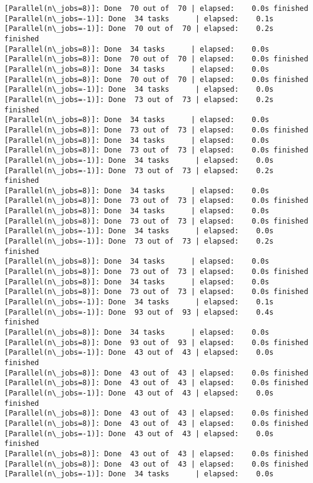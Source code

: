 \documentclass[11pt]{article}
\begin{document}
\begin{Verbatim}[commandchars=\\\{\}]
[Parallel(n\_jobs=8)]: Done  70 out of  70 | elapsed:    0.0s finished
[Parallel(n\_jobs=-1)]: Done  34 tasks      | elapsed:    0.1s
[Parallel(n\_jobs=-1)]: Done  70 out of  70 | elapsed:    0.2s finished
[Parallel(n\_jobs=8)]: Done  34 tasks      | elapsed:    0.0s
[Parallel(n\_jobs=8)]: Done  70 out of  70 | elapsed:    0.0s finished
[Parallel(n\_jobs=8)]: Done  34 tasks      | elapsed:    0.0s
[Parallel(n\_jobs=8)]: Done  70 out of  70 | elapsed:    0.0s finished
[Parallel(n\_jobs=-1)]: Done  34 tasks      | elapsed:    0.0s
[Parallel(n\_jobs=-1)]: Done  73 out of  73 | elapsed:    0.2s finished
[Parallel(n\_jobs=8)]: Done  34 tasks      | elapsed:    0.0s
[Parallel(n\_jobs=8)]: Done  73 out of  73 | elapsed:    0.0s finished
[Parallel(n\_jobs=8)]: Done  34 tasks      | elapsed:    0.0s
[Parallel(n\_jobs=8)]: Done  73 out of  73 | elapsed:    0.0s finished
[Parallel(n\_jobs=-1)]: Done  34 tasks      | elapsed:    0.0s
[Parallel(n\_jobs=-1)]: Done  73 out of  73 | elapsed:    0.2s finished
[Parallel(n\_jobs=8)]: Done  34 tasks      | elapsed:    0.0s
[Parallel(n\_jobs=8)]: Done  73 out of  73 | elapsed:    0.0s finished
[Parallel(n\_jobs=8)]: Done  34 tasks      | elapsed:    0.0s
[Parallel(n\_jobs=8)]: Done  73 out of  73 | elapsed:    0.0s finished
[Parallel(n\_jobs=-1)]: Done  34 tasks      | elapsed:    0.0s
[Parallel(n\_jobs=-1)]: Done  73 out of  73 | elapsed:    0.2s finished
[Parallel(n\_jobs=8)]: Done  34 tasks      | elapsed:    0.0s
[Parallel(n\_jobs=8)]: Done  73 out of  73 | elapsed:    0.0s finished
[Parallel(n\_jobs=8)]: Done  34 tasks      | elapsed:    0.0s
[Parallel(n\_jobs=8)]: Done  73 out of  73 | elapsed:    0.0s finished
[Parallel(n\_jobs=-1)]: Done  34 tasks      | elapsed:    0.1s
[Parallel(n\_jobs=-1)]: Done  93 out of  93 | elapsed:    0.4s finished
[Parallel(n\_jobs=8)]: Done  34 tasks      | elapsed:    0.0s
[Parallel(n\_jobs=8)]: Done  93 out of  93 | elapsed:    0.0s finished
[Parallel(n\_jobs=-1)]: Done  43 out of  43 | elapsed:    0.0s finished
[Parallel(n\_jobs=8)]: Done  43 out of  43 | elapsed:    0.0s finished
[Parallel(n\_jobs=8)]: Done  43 out of  43 | elapsed:    0.0s finished
[Parallel(n\_jobs=-1)]: Done  43 out of  43 | elapsed:    0.0s finished
[Parallel(n\_jobs=8)]: Done  43 out of  43 | elapsed:    0.0s finished
[Parallel(n\_jobs=8)]: Done  43 out of  43 | elapsed:    0.0s finished
[Parallel(n\_jobs=-1)]: Done  43 out of  43 | elapsed:    0.0s finished
[Parallel(n\_jobs=8)]: Done  43 out of  43 | elapsed:    0.0s finished
[Parallel(n\_jobs=8)]: Done  43 out of  43 | elapsed:    0.0s finished
[Parallel(n\_jobs=-1)]: Done  34 tasks      | elapsed:    0.0s

\end{Verbatim}
\end{document}
